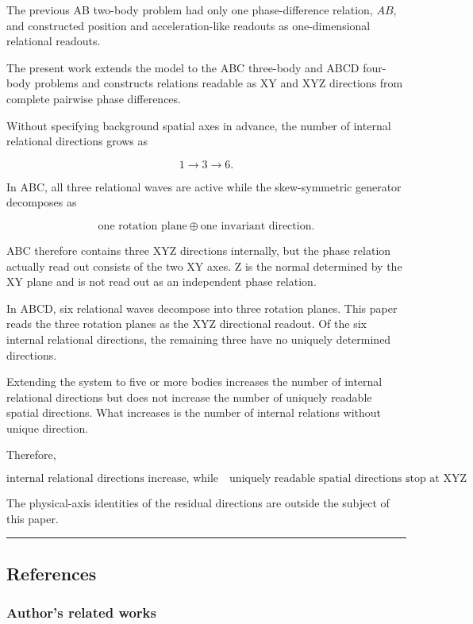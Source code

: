 \documentclass[
  10pt,
  a4paper,
]{article}
\begin{document}
The previous AB two-body problem had only one phase-difference relation,
\(AB\), and constructed position and acceleration-like readouts as
one-dimensional relational readouts.

The present work extends the model to the ABC three-body and ABCD
four-body problems and constructs relations readable as XY and XYZ
directions from complete pairwise phase differences.

Without specifying background spatial axes in advance, the number of
internal relational directions grows as

\[
1\longrightarrow3\longrightarrow6.
\]

In ABC, all three relational waves are active while the skew-symmetric
generator decomposes as

\[
\text{one rotation plane}
\oplus
\text{one invariant direction}.
\]

ABC therefore contains three XYZ directions internally, but the phase
relation actually read out consists of the two XY axes. Z is the normal
determined by the XY plane and is not read out as an independent phase
relation.

In ABCD, six relational waves decompose into three rotation planes. This
paper reads the three rotation planes as the XYZ directional readout. Of
the six internal relational directions, the remaining three have no
uniquely determined directions.

Extending the system to five or more bodies increases the number of
internal relational directions but does not increase the number of
uniquely readable spatial directions. What increases is the number of
internal relations without unique direction.

Therefore,

\[
\boxed{
\text{internal relational directions increase, while}
\quad
\text{uniquely readable spatial directions stop at XYZ}
}.
\]

The physical-axis identities of the residual directions are outside the
subject of this paper.

\begin{center}\rule{0.5\linewidth}{0.5pt}\end{center}

\subsection{References}\label{references}

\subsubsection{Author's related works}\label{authors-related-works}
\end{document}
